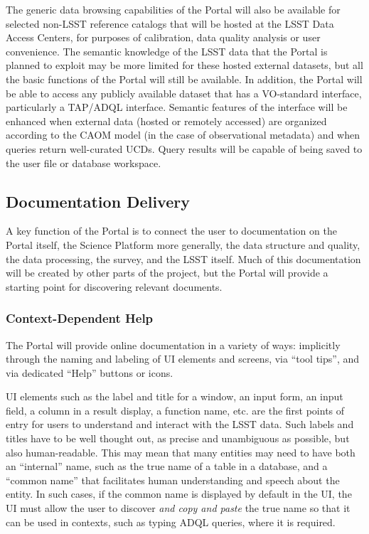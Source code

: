 The generic data browsing capabilities of the Portal will also be available for selected non-LSST reference catalogs that will be hosted at the LSST Data Access Centers, for purposes of calibration, data quality analysis or user convenience.
The semantic knowledge of the LSST data that the Portal is planned to exploit may be more limited for these hosted external datasets, but all the basic functions of the Portal will still be available.
In addition, the Portal will be able to access any publicly available dataset that has a VO-standard interface, particularly a TAP/ADQL interface.
Semantic features of the interface will be enhanced when external data (hosted or remotely accessed) are organized according to the CAOM model (in the case of observational metadata) and when queries return well-curated UCDs.
Query results will be capable of being saved to the user file or database workspace.

\subsection{Documentation Delivery}\label{documentation-delivery}

A key function of the Portal is to connect the user to documentation on the Portal itself, the Science Platform more generally, the data structure and quality, the data processing, the survey, and the LSST itself.
Much of this documentation will be created by other parts of the project, but the Portal will provide a starting point for discovering relevant documents.

\subsubsection{Context-Dependent Help}\label{context-dependent-help}

The Portal will provide online documentation in a variety of ways: implicitly through the naming and labeling of UI elements and screens, via ``tool tips'', and via dedicated ``Help'' buttons or icons.

UI elements such as the label and title for a window, an input form, an input field, a column in a result display, a function name, etc. are the first points of entry for users to understand and interact with the LSST data.
Such labels and titles have to be well thought out, as precise and unambiguous as possible, but also human-readable.
This may mean that many entities may need to have both an ``internal'' name, such as the true name of a table in a database, and a ``common name'' that facilitates human understanding and speech about the entity.
In such cases, if the common name is displayed by default in the UI, the UI must allow the user to discover \emph{and copy and paste} the true name so that it can be used in contexts, such as typing ADQL queries, where it is required.

